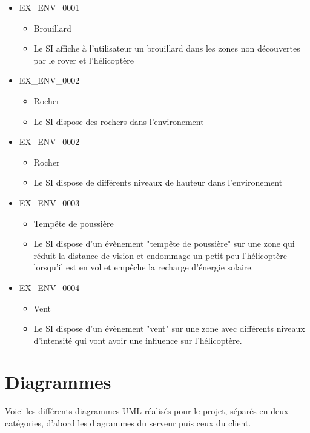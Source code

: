 \documentclass[12pt,a4paper]{scrartcl}
\begin{document}
\begin{itemize}

\item EX\_ENV\_0001
\begin{itemize}
\item Brouillard
\item Le SI affiche à l'utilisateur un brouillard dans les zones non découvertes par le rover et l'hélicoptère
\end{itemize}

\item EX\_ENV\_0002
\begin{itemize}
\item Rocher
\item Le SI dispose des rochers dans l'environement
\end{itemize}

\item EX\_ENV\_0002
\begin{itemize}
\item Rocher
\item Le SI dispose de différents niveaux de hauteur dans l'environement
\end{itemize}

\item EX\_ENV\_0003
\begin{itemize}
\item Tempête de poussière
\item Le SI dispose d'un évènement "tempête de poussière" sur une zone qui
		réduit la distance de vision et endommage un petit peu l'hélicoptère 
		lorsqu'il est en vol et empêche la recharge d'énergie solaire.
\end{itemize}

\item EX\_ENV\_0004
\begin{itemize}
\item Vent
\item Le SI dispose d'un évènement "vent" sur une zone avec différents niveaux d'intensité qui vont avoir une influence sur l'hélicoptère.
\end{itemize}

\end{itemize}

\section {Diagrammes}
Voici les différents diagrammes UML réalisés pour le projet, séparés en deux catégories, d'abord les diagrammes 
du serveur puis ceux du client.
\end{document}
